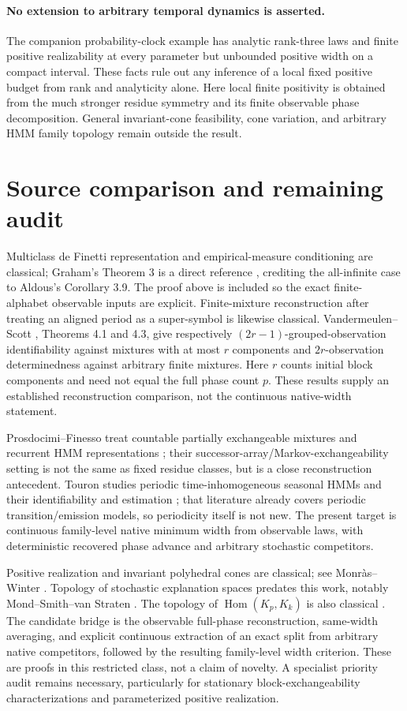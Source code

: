 \documentclass[11pt]{article}
\theoremstyle{remark}\newtheorem{remark}[theorem]{Remark}
\newcommand{\Hom}{\operatorname{Hom}}\newcommand{\eps}{\varepsilon}
\begin{document}
\paragraph{No extension to arbitrary temporal dynamics is asserted.}
The companion probability-clock example has analytic rank-three laws and finite positive realizability at every parameter but unbounded positive width on a compact interval. These facts rule out any inference of a local fixed positive budget from rank and analyticity alone. Here local finite positivity is obtained from the much stronger residue symmetry and its finite observable phase decomposition. General invariant-cone feasibility, cone variation, and arbitrary HMM family topology remain outside the result.

\section{Source comparison and remaining audit}
Multiclass de Finetti representation and empirical-measure conditioning are classical; Graham's Theorem 3 is a direct reference \cite{Graham}, crediting the all-infinite case to Aldous's Corollary 3.9. The proof above is included so the exact finite-alphabet observable inputs are explicit. Finite-mixture reconstruction after treating an aligned period as a super-symbol is likewise classical. Vandermeulen--Scott \cite{VS}, Theorems 4.1 and 4.3, give respectively $(2r-1)$-grouped-observation identifiability against mixtures with at most $r$ components and $2r$-observation determinedness against arbitrary finite mixtures. Here $r$ counts initial block components and need not equal the full phase count $p$. These results supply an established reconstruction comparison, not the continuous native-width statement.

Prosdocimi--Finesso treat countable partially exchangeable mixtures and recurrent HMM representations \cite{PF}; their successor-array/Markov-exchangeability setting is not the same as fixed residue classes, but is a close reconstruction antecedent. Touron studies periodic time-inhomogeneous seasonal HMMs and their identifiability and estimation \cite{Touron}; that literature already covers periodic transition/emission models, so periodicity itself is not new. The present target is continuous family-level native minimum width from observable laws, with deterministic recovered phase advance and arbitrary stochastic competitors.

Positive realization and invariant polyhedral cones are classical; see Monr\`as--Winter \cite{MW}. Topology of stochastic explanation spaces predates this work, notably Mond--Smith--van Straten \cite{MSV}. The topology of $\Hom(K_p,K_k)$ is also classical \cite{BK,AGH}. The candidate bridge is the observable full-phase reconstruction, same-width averaging, and explicit continuous extraction of an exact split from arbitrary native competitors, followed by the resulting family-level width criterion. These are proofs in this restricted class, not a claim of novelty. A specialist priority audit remains necessary, particularly for stationary block-exchangeability characterizations and parameterized positive realization.
\end{document}
